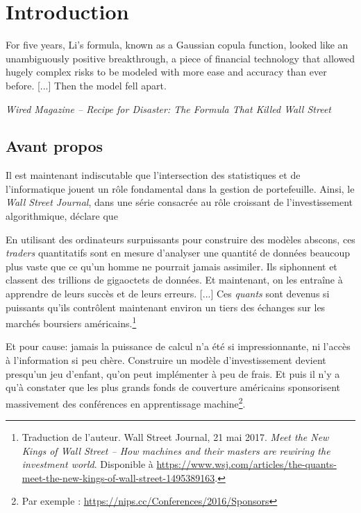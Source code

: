 \section{Introduction}
\label{sec:intro}

\epigraph{For five years, Li's formula, known as a Gaussian copula function, looked like
  an unambiguously positive breakthrough, a piece of financial technology that allowed
  hugely complex risks to be modeled with more ease and accuracy than ever before. [...]
  Then the model fell apart.}{\textit{Wired Magazine -- Recipe for Disaster: The Formula
    That Killed Wall Street}}


\subsection{Avant propos}

Il est maintenant indiscutable que l'intersection des statistiques et de l'informatique
jouent un rôle fondamental dans la gestion de portefeuille. Ainsi, le \textsl{Wall Street
  Journal}, dans une série consacrée au rôle croissant de l'investissement algorithmique,
déclare que
\begin{displayquote}
  En utilisant des ordinateurs surpuissants pour construire des modèles abscons, ces
  \textit{traders} quantitatifs sont en mesure d'analyser une quantité de données beaucoup
  plus vaste que ce qu'un homme ne pourrait jamais assimiler. Ils siphonnent et classent
  des trillions de gigaoctets de données. Et maintenant, on les entraîne à apprendre de
  leurs succès et de leurs erreurs. [...] Ces \textit{quants} sont devenus si puissants
  qu'ils contrôlent maintenant environ un tiers des échanges sur les marchés boursiers
  américains.\footnote{Traduction de l'auteur. Wall Street Journal, 21 mai
    2017. \textit{Meet the New Kings of Wall Street -- How machines and their masters are
      rewiring the investment world}. Disponible à {\scriptsize
      \url{https://www.wsj.com/articles/the-quants-meet-the-new-kings-of-wall-street-1495389163}}.}
\end{displayquote}
Et pour cause: jamais la puissance de calcul n'a été si impressionnante, ni l'accès à
l'information si peu chère. Construire un modèle d'investissement devient presqu'un jeu
d'enfant, qu'on peut implémenter à peu de frais. Et puis il n'y a qu'à constater que les
plus grands fonds de couverture américains sponsorisent massivement des conférences en
apprentissage machine\footnote{Par exemple : {\scriptsize
    \url{https://nips.cc/Conferences/2016/Sponsors}}}.

